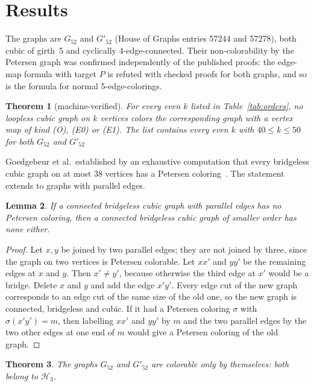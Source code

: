 \documentclass[11pt]{article}
\newtheorem{theorem}{Theorem}[section]
\newtheorem{lemma}[theorem]{Lemma}
\theoremstyle{definition}
\theoremstyle{remark}
\newcommand{\PG}{P}
\newcommand{\Hthree}{\mathcal{H}_3}
\newcommand{\Ga}{G_{52}}
\newcommand{\Gb}{G'_{52}}
\begin{document}
\section{Results}\label{sec:results}

The graphs are $\Ga$ and $\Gb$ (House of Graphs entries 57244 and 57278), both cubic of girth~5
and cyclically 4-edge-connected. Their non-colorability by the Petersen graph was confirmed
independently of the published proofs: the edge-map formula with target $\PG$ is refuted with
checked proofs for both graphs, and so is the formula for normal 5-edge-colorings.

\begin{theorem}[machine-verified]\label{thm:orders}
For every even $k$ listed in Table~\ref{tab:orders}, no loopless cubic graph on $k$ vertices colors
the corresponding graph with a vertex map of kind \textup{(O)}, \textup{(E0)} or \textup{(E1)}.
The list contains every even $k$ with $40 \le k \le 50$ for both $\Ga$ and $\Gb$%
\end{theorem}

Goedgebeur et al.\ established by an exhaustive computation that every bridgeless cubic graph on
at most 38 vertices has a Petersen coloring~\cite[Observation~9]{GJMMMU2026}. The statement
extends to graphs with parallel edges.

\begin{lemma}\label{lem:digon}
If a connected bridgeless cubic graph with parallel edges has no Petersen coloring, then a
connected bridgeless cubic graph of smaller order has none either.
\end{lemma}

\begin{proof}
Let $x, y$ be joined by two parallel edges; they are not joined by three, since the graph on two
vertices is Petersen colorable. Let $xx'$ and $yy'$ be the remaining edges at $x$ and $y$. Then
$x' \ne y'$, because otherwise the third edge at $x'$ would be a bridge. Delete $x$ and $y$ and
add the edge $x'y'$. Every edge cut of the new graph corresponds to an edge cut of the same size
of the old one, so the new graph is connected, bridgeless and cubic. If it had a Petersen
coloring $\sigma$ with $\sigma(x'y') = m$, then labelling $xx'$ and $yy'$ by $m$ and the two
parallel edges by the two other edges at one end of $m$ would give a Petersen coloring of the
old graph.
\end{proof}

\begin{theorem}\label{thm:h3}
The graphs $\Ga$ and $\Gb$ are colorable only by themselves: both belong to $\Hthree$.
\end{theorem}
\end{document}
